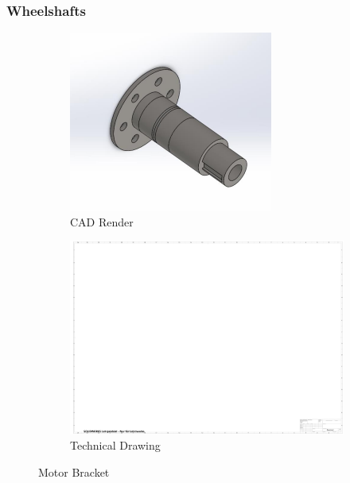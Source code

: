 \subsubsection{Wheelshafts}
\begin{figure}[ht!]
  \centering
  \begin{subfigure}{.5\textwidth}
    \centering
    \includegraphics[width=\linewidth]{texfiles/mech/eimg/propulsion/picture_wheelshaft}
    \caption{CAD Render}
    \label{fig:CAD Motorshaft}
  \end{subfigure}%
  \begin{subfigure}{.5\textwidth}
    \centering
    \includegraphics[width=\linewidth]{texfiles/mech/eimg/propulsion/spaceholder_technical_drawing}
    \caption{Technical Drawing}
    \label{fig:TD Motorshaft}
  \end{subfigure}
  \caption{Motor Bracket}
  \label{fig:Motorshaft}
  \end{figure}


